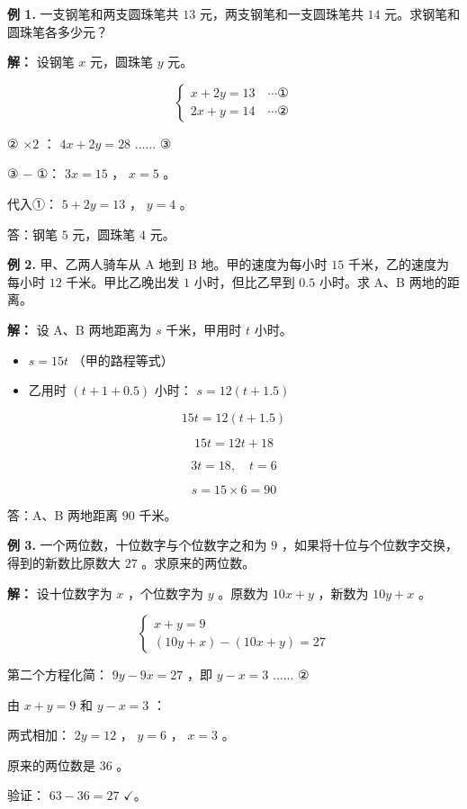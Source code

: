 \begin{workedexamples}


\textbf{例 1.} 一支钢笔和两支圆珠笔共 $13$ 元，两支钢笔和一支圆珠笔共 $14$ 元。求钢笔和圆珠笔各多少元？

\textbf{解：} 设钢笔 $x$ 元，圆珠笔 $y$ 元。

\[
\begin{cases} x + 2y = 13 \quad \cdots ① \\ 2x + y = 14 \quad \cdots ② \end{cases}
\]


② $\times 2$ ： $4x + 2y = 28$ ...... ③

③ $-$ ①： $3x = 15$ ， $x = 5$ 。

代入①： $5 + 2y = 13$ ， $y = 4$ 。

答：钢笔 $5$ 元，圆珠笔 $4$ 元。

\textbf{例 2.} 甲、乙两人骑车从 A 地到 B 地。甲的速度为每小时 $15$ 千米，乙的速度为每小时 $12$ 千米。甲比乙晚出发 $1$ 小时，但比乙早到 $0.5$ 小时。求 A、B 两地的距离。

\textbf{解：} 设 A、B 两地距离为 $s$ 千米，甲用时 $t$ 小时。

\begin{itemize}
  \item $s = 15t$ （甲的路程等式）
  \item 乙用时 $(t + 1 + 0.5)$ 小时： $s = 12(t + 1.5)$
\end{itemize}


\[
15t = 12(t + 1.5)
\]


\[
15t = 12t + 18
\]


\[
3t = 18, \quad t = 6
\]


\[
s = 15 \times 6 = 90
\]


答：A、B 两地距离 $90$ 千米。

\textbf{例 3.} 一个两位数，十位数字与个位数字之和为 $9$ ，如果将十位与个位数字交换，得到的新数比原数大 $27$ 。求原来的两位数。

\textbf{解：} 设十位数字为 $x$ ，个位数字为 $y$ 。原数为 $10x + y$ ，新数为 $10y + x$ 。

\[
\begin{cases} x + y = 9 \\ (10y + x) - (10x + y) = 27 \end{cases}
\]


第二个方程化简： $9y - 9x = 27$ ，即 $y - x = 3$ ...... ②

由 $x + y = 9$ 和 $y - x = 3$ ：

两式相加： $2y = 12$ ， $y = 6$ ， $x = 3$ 。

原来的两位数是 $36$ 。

验证： $63 - 36 = 27$ $\checkmark$。

\end{workedexamples}

